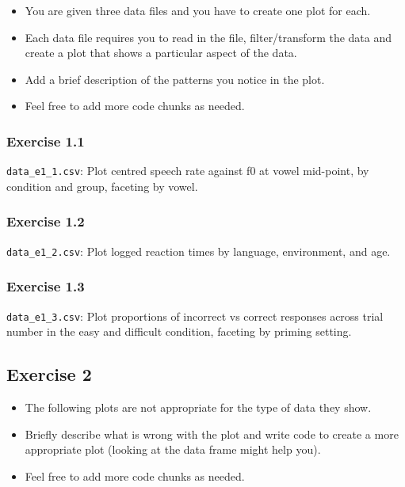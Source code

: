 \documentclass[
]{article}
\providecommand{\tightlist}{%
  \setlength{\itemsep}{0pt}\setlength{\parskip}{0pt}}
\begin{document}
\begin{itemize}
\tightlist
\item
  You are given three data files and you have to create one plot for
  each.
\item
  Each data file requires you to read in the file, filter/transform the
  data and create a plot that shows a particular aspect of the data.
\item
  Add a brief description of the patterns you notice in the plot.
\item
  Feel free to add more code chunks as needed.
\end{itemize}

\hypertarget{exercise-1.1}{%
\subsubsection{Exercise 1.1}\label{exercise-1.1}}

\texttt{data\_e1\_1.csv}: Plot centred speech rate against f0 at vowel
mid-point, by condition and group, faceting by vowel.

\hypertarget{exercise-1.2}{%
\subsubsection{Exercise 1.2}\label{exercise-1.2}}

\texttt{data\_e1\_2.csv}: Plot logged reaction times by language,
environment, and age.

\hypertarget{exercise-1.3}{%
\subsubsection{Exercise 1.3}\label{exercise-1.3}}

\texttt{data\_e1\_3.csv}: Plot proportions of incorrect vs correct
responses across trial number in the easy and difficult condition,
faceting by priming setting.

\hypertarget{exercise-2}{%
\subsection{Exercise 2}\label{exercise-2}}

\begin{itemize}
\tightlist
\item
  The following plots are not appropriate for the type of data they
  show.
\item
  Briefly describe what is wrong with the plot and write code to create
  a more appropriate plot (looking at the data frame might help you).
\item
  Feel free to add more code chunks as needed.
\end{itemize}
\end{document}

